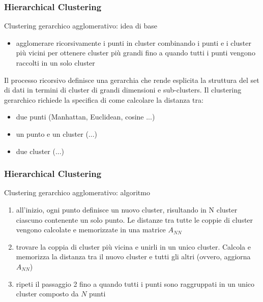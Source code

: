 \begin{frame}

	\frametitle{{\color{GradientDescentDiagramGreen}Hierarchical Clustering}}

	\begin{block}{Clustering gerarchico agglomerativo: idea di base}
		\begin{itemize}
			\item agglomerare ricorsivamente i punti in cluster combinando i punti e i cluster più vicini per ottenere cluster più grandi fino a quando tutti i punti vengono raccolti in un solo cluster
		\end{itemize}
		Il processo ricorsivo definisce una gerarchia che rende esplicita la struttura del set di dati in termini di cluster di grandi dimensioni e sub-clusters.
		\newlinedouble
		Il clustering gerarchico richiede la specifica di come calcolare la distanza tra:
		\begin{itemize}
			\item due punti (Manhattan, Euclidean, cosine ...)
			\item un punto e un cluster (...)
			\item due cluster (...)
		\end{itemize}
	\end{block}

\end{frame}


\begin{frame}

	\frametitle{{\color{GradientDescentDiagramGreen}Hierarchical Clustering}}

	\begin{block}{Clustering gerarchico agglomerativo: algoritmo}
		\begin{enumerate}
			\item all'inizio, ogni punto definisce un nuovo cluster, risultando in N cluster ciascuno contenente un solo punto. Le distanze tra tutte le coppie di cluster vengono calcolate e memorizzate in una matrice $A_{NN}$
			\item trovare la coppia di cluster più vicina e unirli in un unico cluster. Calcola e memorizza la distanza tra il nuovo cluster e tutti gli altri (ovvero, aggiorna $A_{NN}$)
			\item ripeti il passaggio 2 fino a quando tutti i punti sono raggruppati in un unico cluster composto da $N$ punti
		\end{enumerate}
	\end{block}

\end{frame}


